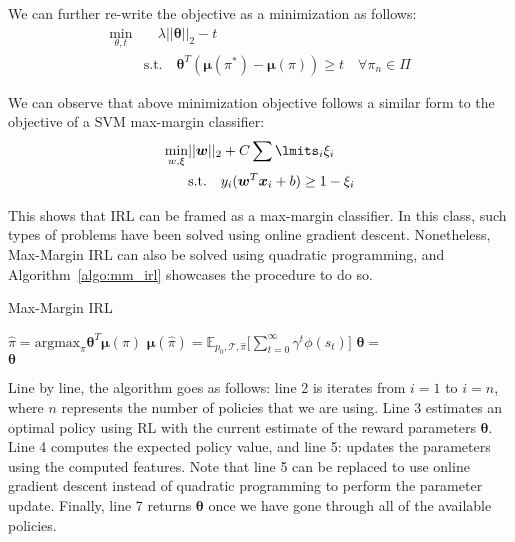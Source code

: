 \documentclass[11pt]{article}
\begin{document}
We can further re-write the objective as a minimization as follows:
\begin{equation}
    \label{eq:min_obj_mmirl}
    \begin{split}
        \min\limits_{\theta, t} & \quad\lambda ||\boldsymbol\theta||_2 - t \\
        & \textrm{s.t.} \quad \boldsymbol{\theta}^T(\boldsymbol{\mu}(\pi^\ast) - \boldsymbol{\mu}(\pi)) \geq t \quad \forall \pi_n \in \Pi
    \end{split}
\end{equation}

We can observe that above minimization objective follows a similar form to the objective of a SVM max-margin classifier:
\begin{equation}
    \begin{split}
        \min\limits_{w, \xi} & ||\boldsymbol{w}||_2 + C\sum\lmits_i \xi_i \\
        & \textrm{s.t.} \quad y_i (\boldsymbol{w}^T\boldsymbol{x}_i +b) \geq 1 - \xi_i
    \end{split}
\end{equation}

This shows that IRL can be framed as a max-margin classifier. In this class, such types of problems have been solved using online gradient descent. Nonetheless, Max-Margin IRL can also be solved using quadratic programming, and Algorithm~\ref{algo:mm_irl} showcases the procedure to do so.

\begin{algorithm}[H]
    \label{algo:mm_irl}
    \caption{Max-Margin IRL}
    \begin{algorithmic}[1]
    \State $\hat{\pi} = \text{argmax}_\pi \boldsymbol{\theta}^{T} \boldsymbol{\mu}(\pi)$
    \State $\boldsymbol{\mu}(\hat{\pi}) = \mathbb{E}_{p_0, \mathcal{T}, \hat{\pi}}\big[\sum\limits_{t=0}^\infty \gamma^{t} \phi(s_t)\big]$
    \State $\boldsymbol{\theta} = $ 
    \EndFor \\
    \Return $\boldsymbol{\theta}$
    \EndFunction
    \end{algorithmic}
\end{algorithm}

Line by line, the algorithm goes as follows: line 2 is iterates from $i=1$ to $i=n$, where $n$ represents the number of policies that we are using. Line 3 estimates an optimal policy using RL with the current estimate of the reward parameters $\boldsymbol{\theta}$. Line 4 computes the expected policy value, and line 5: updates the parameters using the computed features. Note that line 5 can be replaced to use online gradient descent instead of quadratic programming to perform the parameter update. Finally, line 7 returns $\boldsymbol \theta$ once we have gone through all of the available policies. 
\end{document}

